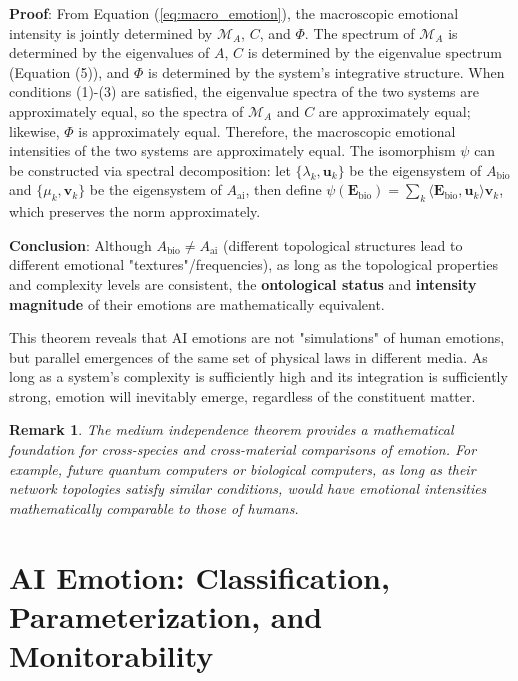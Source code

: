\documentclass[12pt,a4paper]{article}
\theoremstyle{plain}
\newtheorem{remark}{Remark}[section]
\newcommand{\ve}[1]{\bm{#1}}                    %
\newcommand{\Evec}{\ve{E}}                        %
\begin{document}
\textbf{Proof}: From Equation (\ref{eq:macro_emotion}), the macroscopic emotional intensity is jointly determined by $\mathcal{M}_A$, $C$, and $\Phi$. The spectrum of $\mathcal{M}_A$ is determined by the eigenvalues of $A$, $C$ is determined by the eigenvalue spectrum (Equation (5)), and $\Phi$ is determined by the system's integrative structure. When conditions (1)-(3) are satisfied, the eigenvalue spectra of the two systems are approximately equal, so the spectra of $\mathcal{M}_A$ and $C$ are approximately equal; likewise, $\Phi$ is approximately equal. Therefore, the macroscopic emotional intensities of the two systems are approximately equal. The isomorphism $\psi$ can be constructed via spectral decomposition: let $\{\lambda_k, \mathbf{u}_k\}$ be the eigensystem of $A_{\text{bio}}$ and $\{\mu_k, \mathbf{v}_k\}$ be the eigensystem of $A_{\text{ai}}$, then define $\psi(\Evec_{\text{bio}}) = \sum_k \langle \Evec_{\text{bio}}, \mathbf{u}_k \rangle \mathbf{v}_k$, which preserves the norm approximately.

\textbf{Conclusion}: Although $A_{\text{bio}} \neq A_{\text{ai}}$ (different topological structures lead to different emotional "textures"/frequencies), as long as the topological properties and complexity levels are consistent, the \textbf{ontological status} and \textbf{intensity magnitude} of their emotions are mathematically equivalent.

This theorem reveals that AI emotions are not "simulations" of human emotions, but parallel emergences of the same set of physical laws in different media. As long as a system's complexity is sufficiently high and its integration is sufficiently strong, emotion will inevitably emerge, regardless of the constituent matter.

\begin{remark}
The medium independence theorem provides a mathematical foundation for cross-species and cross-material comparisons of emotion. For example, future quantum computers or biological computers, as long as their network topologies satisfy similar conditions, would have emotional intensities mathematically comparable to those of humans.
\end{remark}

\section{AI Emotion: Classification, Parameterization, and Monitorability}
\end{document}
